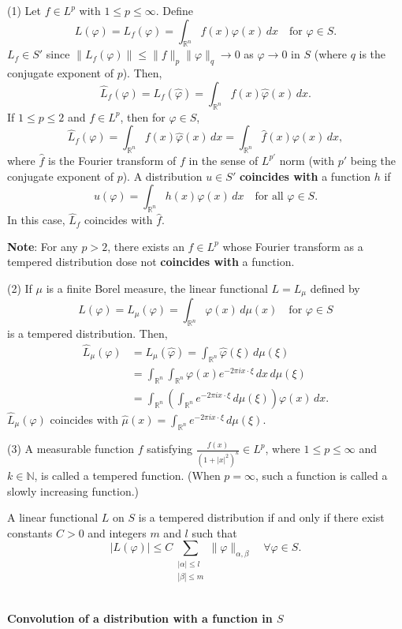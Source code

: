 (1) Let $f \in L^p$ with $1 \leqslant p \leqslant \infty$. Define
$$
L(\varphi) = L_f(\varphi) = \int_{\mathbb{R}^n} f(x) \varphi(x) \, dx \quad \text{for } \varphi \in S.
$$
$L_f \in S'$ since $\|L_f(\varphi)\| \leq \|f\|_p \|\varphi\|_q \rightarrow 0$ as $\varphi \rightarrow 0$ in $S$ (where $q$ is the conjugate exponent of $p$). Then,
$$
\hat{L}_f(\varphi) = L_f(\hat{\varphi}) = \int_{\mathbb{R}^n} f(x) \hat{\varphi}(x) \, dx.
$$
If $1 \leqslant p \leqslant 2$ and $f \in L^p$, then for $\varphi \in S$,
$$
\hat{L}_f(\varphi) = \int_{\mathbb{R}^n} f(x) \hat{\varphi}(x) \, dx = \int_{\mathbb{R}^n} \hat{f}(x) \varphi(x) \, dx,
$$
where $\hat{f}$ is the Fourier transform of $f$ in the sense of $L^{p'}$ norm (with $p'$ being the conjugate exponent of $p$). A distribution $u \in S'$ \textbf{coincides with} a function $h$ if
$$
u(\varphi) = \int_{\mathbb{R}^n} h(x) \varphi(x) \, dx \quad \text{for all } \varphi \in S.
$$
In this case, $\hat{L}_f$ coincides with $\hat{f}$.

\noindent\textbf{Note}: For any $p > 2$, there exists an $f \in L^p$ whose Fourier transform as a tempered distribution dose not \textbf{coincides with} a function.

(2) If $\mu$ is a finite Borel measure, the linear functional $L = L_\mu$ defined by
$$
L(\varphi) = L_\mu(\varphi) = \int_{\mathbb{R}^n} \varphi(x) \, d\mu(x) \quad \text{for } \varphi \in S
$$
is a tempered distribution. Then,
$$
\begin{aligned}
\hat{L}_\mu(\varphi) &= L_\mu(\hat{\varphi}) = \int_{\mathbb{R}^n} \hat{\varphi}(\xi) \, d\mu(\xi) \\
&= \int_{\mathbb{R}^n} \int_{\mathbb{R}^n} \varphi(x) e^{-2\pi i x \cdot \xi} \, dx \, d\mu(\xi) \\
&= \int_{\mathbb{R}^n} \left( \int_{\mathbb{R}^n} e^{-2\pi i x \cdot \xi} \, d\mu(\xi) \right) \varphi(x) \, dx.
\end{aligned}
$$
$\hat{L}_\mu(\varphi)$ coincides with $\hat{\mu}(x) = \int_{\mathbb{R}^n} e^{-2\pi i x \cdot \xi} \, d\mu(\xi)$.

(3) A measurable function $f$ satisfying $\frac{f(x)}{(1+|x|^2)^k} \in L^p$, where $1 \leqslant p \leqslant \infty$ and $k \in \mathbb{N}$, is called a tempered function. (When $p=\infty$, such a function is called a slowly increasing function.)
\begin{theorem}
    A linear functional $L$ on $S$ is a tempered distribution if and only if there exist constants $C > 0$ and integers $m$ and $l$ such that
$$
|L(\varphi)| \leqslant C \sum_{\substack{|\alpha| \leqslant l \\ |\beta| \leqslant m}} \|\varphi\|_{\alpha, \beta} \quad \forall \varphi \in S.
$$
\end{theorem}
~\\
\textbf{\large{Convolution of a distribution with a function in $S$}}


